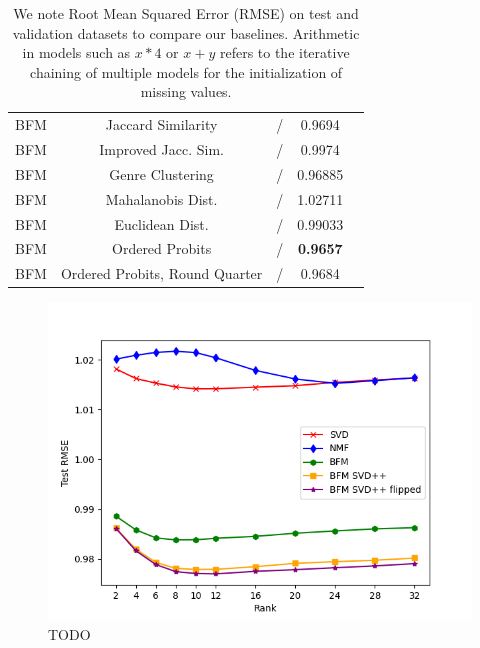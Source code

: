 \documentclass[10pt,conference,compsocconf]{IEEEtran}
\begin{document}
\begin{table}
{\begin{tabular}{|| c | c | c | c | c ||}
                \hline
                BFM               & Jaccard Similarity                & /                       & 0.9694                 &                         \\
                BFM               & Improved Jacc. Sim.               & /                       & 0.9974                 &                         \\
                BFM               & Genre Clustering                  & /                       & 0.96885                &                         \\
                BFM               & Mahalanobis Dist.                 & /                       & 1.02711                &                         \\
                BFM               & Euclidean Dist.                   & /                       & 0.99033                &                         \\
                BFM               & Ordered Probits                   & /                       & \textbf{ 0.9657 }      &                         \\
                BFM               & Ordered Probits, Round Quarter    & /                       & 0.9684                 &                         \\
                \hline
            \end{tabular}
        }
        \caption{We note Root Mean Squared Error (RMSE) on test and validation datasets to compare our baselines.
        Arithmetic in models such as $x * 4$ or $x + y$ refers to the iterative chaining of multiple models for the initialization of missing values.
        }
        \label{tab:ablation}
    \end{table}

    \begin{figure}
        \includegraphics[width=\columnwidth]{figures/rank.png}
        \caption{TODO}
        \label{fig:rank}
    \end{figure}
\end{document}
